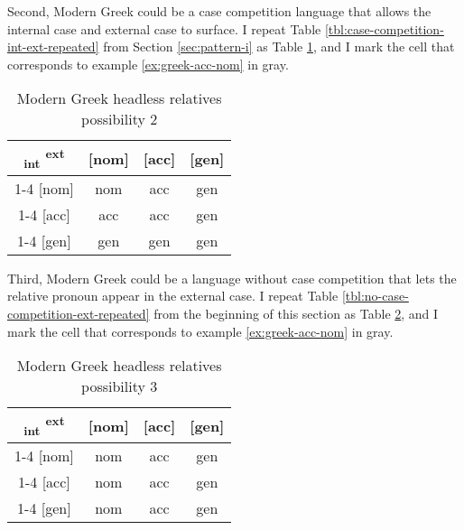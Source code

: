 Second, Modern Greek could be a case competition language that allows the internal case and external case to surface. I repeat Table \ref{tbl:case-competition-int-ext-repeated} from Section \ref{sec:pattern-i} as Table \ref{tbl:greek-poss2}, and I mark the cell that corresponds to example \ref{ex:greek-acc-nom} in gray.

  \begin{table}[ht]
    \center
    \caption{Modern Greek headless relatives possibility 2}
    \begin{tabular}{c|c|c|c}
      \toprule
      \textsubscript{\ac{int}} \textsuperscript{\ac{ext}}
             & [\ac{nom}]
             & [\ac{acc}]
             & [\ac{gen}]
             \\ \cmidrule{1-4}
         [\ac{nom}]
             & \ac{nom}
             & \cellcolor{LG}\ac{acc}
             & \ac{gen}
             \\ \cmidrule{1-4}
         [\ac{acc}]
             & \ac{acc}
             & \ac{acc}
             & \ac{gen}
             \\ \cmidrule{1-4}
         [\ac{gen}]
             & \ac{gen}
             & \ac{gen}
             & \ac{gen}
             \\
       \bottomrule
    \end{tabular}
      \label{tbl:greek-poss2}
  \end{table}

Third, Modern Greek could be a language without case competition that lets the relative pronoun appear in the external case. I repeat Table \ref{tbl:no-case-competition-ext-repeated} from the beginning of this section as Table \ref{tbl:greek-poss3}, and I mark the cell that corresponds to example \ref{ex:greek-acc-nom} in gray.

 \begin{table}[ht]
   \center
   \caption{Modern Greek headless relatives possibility 3}
   \begin{tabular}{c|c|c|c}
     \toprule
    \textsubscript{\ac{int}} \textsuperscript{\ac{ext}}
           & [\ac{nom}]
           & [\ac{acc}]
           & [\ac{gen}]
           \\ \cmidrule{1-4}
       [\ac{nom}]
           & \ac{nom}
           & \cellcolor{LG}\ac{acc}
           & \ac{gen}
           \\ \cmidrule{1-4}
       [\ac{acc}]
           & \ac{nom}
           & \ac{acc}
           & \ac{gen}
           \\ \cmidrule{1-4}
       [\ac{gen}]
           & \ac{nom}
           & \ac{acc}
           & \ac{gen}
           \\
     \bottomrule
   \end{tabular}
   \label{tbl:greek-poss3}
 \end{table}

